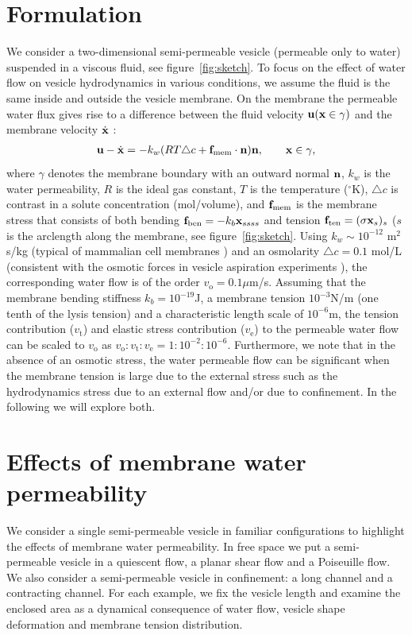 \documentclass[9pt,twocolumn,twoside,lineno]{pnas-new}
\begin{document}
\section*{Formulation}
We consider a two-dimensional semi-permeable vesicle (permeable only to water) suspended in a viscous fluid, see figure~\ref{fig:sketch}.
To focus on the effect of water flow on vesicle hydrodynamics in various conditions, we assume the fluid is the same inside and outside the vesicle membrane.
On the membrane the permeable water flux gives rise to a difference between the fluid velocity ${\bf u}({\bf x}\in \gamma)$
and the membrane velocity $\dot{\bf x}$ \cite{yao-mor2017}:
\begin{align}
  \label{eqn:vesicleFlux}
  \mathbf{u} - \dot{\mathbf{x}} = - k_w (R T \triangle c + \mathbf{f}_\mathrm{mem} \cdot \mathbf{n}) \mathbf{n}, \qquad
  \mathbf{x} \in \gamma,
\end{align}
where $\gamma$ denotes the membrane boundary with an outward normal $\mathbf{n}$, $k_w$ is the water permeability, $R$ is the ideal gas constant, $T$ is the temperature ($^{\circ}$K), $\triangle c$ is contrast in a solute concentration (mol/volume),
and $\mathbf{f}_\mathrm{mem}$ is the membrane stress that consists of both bending $ \mathbf{f}_\mathrm{ben}= -k_b \mathbf{x}_{ssss}$ and tension $\mathbf{f}_\mathrm{ten}=(\sigma \mathbf{x}_s)_s$ ($s$
is the arclength along the membrane, see figure~\ref{fig:sketch}. Using $k_w\sim 10^{-12}$ m$^2$s/kg (typical of mammalian cell membranes \cite{LiMoriSun2015_PRL}) and an osmolarity $\triangle c = 0.1$ mol/L (consistent with the osmotic forces in vesicle aspiration experiments \cite{OlbrichRawiczNeedhamEtAl2000_BJ}), the corresponding water flow is of the order $v_\mathrm{o}=0.1 \mu$m/s. Assuming that the membrane bending stiffness $k_b = 10^{-19}$J, a membrane tension $10^{-3}$N/m (one tenth of the lysis tension) and a characteristic length scale of $10^{-6}$m, the tension contribution ($v_\mathrm{t}$) and elastic stress contribution 
($v_\mathrm{e}$) to the permeable water flow can be scaled to $v_\mathrm{o}$ as $v_\mathrm{o}:v_\mathrm{t}:v_\mathrm{e}=1:10^{-2}:10^{-6}$.  Furthermore, we note that in the absence of an osmotic stress, the water permeable flow can be significant when the membrane tension is large due to the external stress such as the hydrodynamics stress due to an external flow and/or due to confinement.
In the following we will explore both.


\section*{Effects of membrane water permeability}
We consider a single semi-permeable vesicle in familiar configurations to highlight the effects of membrane water permeability.
In free space we put a semi-permeable vesicle in a quiescent flow, a planar shear flow and a Poiseuille flow.
We also consider a semi-permeable vesicle in confinement: a long channel and a contracting channel.
For each example, we fix the vesicle length and examine the enclosed area as a dynamical consequence of water flow, vesicle shape deformation and membrane tension distribution.
\end{document}
